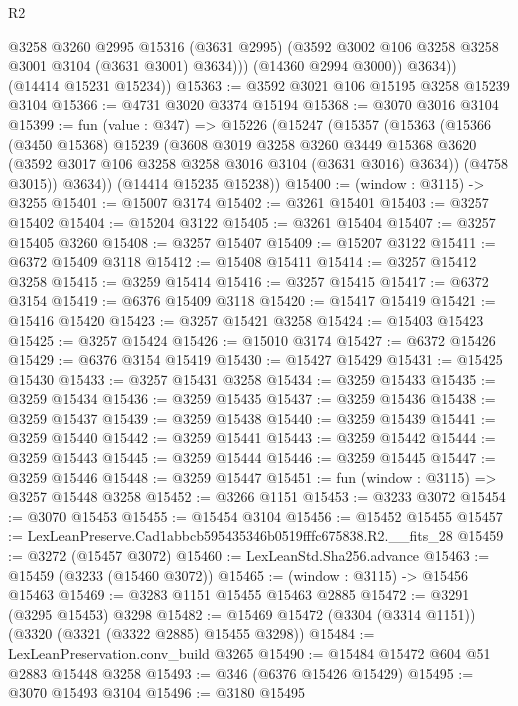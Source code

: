 \begin{lexlean}{R2}
\begin{coremodule}
                @3258
                @3260
                @2995
                @15316
                (@3631 @2995)
                (@3592 @3002 @106 @3258 @3258 @3001 @3104 (@3631 @3001) @3634)))
            (@14360 @2994 @3000))
          @3634))
      (@14414 @15231 @15234))
@15363 := @3592 @3021 @106 @15195 @3258 @15239 @3104
@15366 := @4731 @3020 @3374 @15194
@15368 := @3070 @3016 @3104
@15399 := fun (value : @347) =>
  @15226
    (@15247
      (@15357
        (@15363
          (@15366
            (@3450 @15368)
            @15239
            (@3608
              @3019
              @3258
              @3260
              @3449
              @15368
              @3620
              (@3592 @3017 @106 @3258 @3258 @3016 @3104 (@3631 @3016) @3634))
            (@4758 @3015))
          @3634))
      (@14414 @15235 @15238))
@15400 := (window : @3115) -> @3255
@15401 := @15007 @3174
@15402 := @3261 @15401
@15403 := @3257 @15402
@15404 := @15204 @3122
@15405 := @3261 @15404
@15407 := @3257 @15405 @3260
@15408 := @3257 @15407
@15409 := @15207 @3122
@15411 := @6372 @15409 @3118
@15412 := @15408 @15411
@15414 := @3257 @15412 @3258
@15415 := @3259 @15414
@15416 := @3257 @15415
@15417 := @6372 @3154
@15419 := @6376 @15409 @3118
@15420 := @15417 @15419
@15421 := @15416 @15420
@15423 := @3257 @15421 @3258
@15424 := @15403 @15423
@15425 := @3257 @15424
@15426 := @15010 @3174
@15427 := @6372 @15426
@15429 := @6376 @3154 @15419
@15430 := @15427 @15429
@15431 := @15425 @15430
@15433 := @3257 @15431 @3258
@15434 := @3259 @15433
@15435 := @3259 @15434
@15436 := @3259 @15435
@15437 := @3259 @15436
@15438 := @3259 @15437
@15439 := @3259 @15438
@15440 := @3259 @15439
@15441 := @3259 @15440
@15442 := @3259 @15441
@15443 := @3259 @15442
@15444 := @3259 @15443
@15445 := @3259 @15444
@15446 := @3259 @15445
@15447 := @3259 @15446
@15448 := @3259 @15447
@15451 := fun (window : @3115) => @3257 @15448 @3258
@15452 := @3266 @1151
@15453 := @3233 @3072
@15454 := @3070 @15453
@15455 := @15454 @3104
@15456 := @15452 @15455
@15457 := LexLeanPreserve.Cad1abbcb595435346b0519fffc675838.R2.__fits_28
@15459 := @3272 (@15457 @3072)
@15460 := LexLeanStd.Sha256.advance
@15463 := @15459 (@3233 (@15460 @3072))
@15465 := (window : @3115) -> @15456 @15463
@15469 := @3283 @1151 @15455 @15463 @2885
@15472 := @3291 (@3295 @15453) @3298
@15482 := @15469 @15472 (@3304 (@3314 @1151)) (@3320 (@3321 (@3322 @2885) @15455 @3298))
@15484 := LexLeanPreservation.conv_build @3265
@15490 := @15484 @15472 @604 @51 @2883 @15448 @3258
@15493 := @346 (@6376 @15426 @15429)
@15495 := @3070 @15493 @3104
@15496 := @3180 @15495

\end{coremodule}
\end{lexlean}
